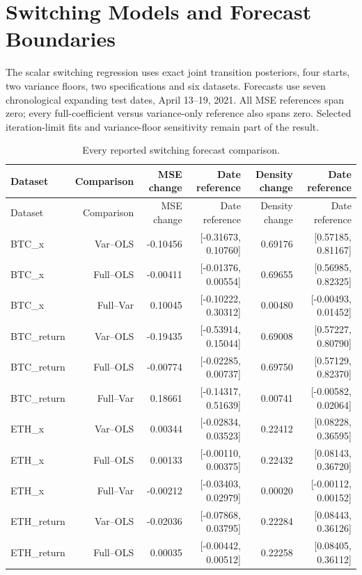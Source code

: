 \documentclass[10pt]{article}
\begin{document}
\section{Switching Models and Forecast Boundaries}
The scalar switching regression uses exact joint transition posteriors, four starts, two variance floors, two specifications and six datasets. Forecasts use seven chronological expanding test dates, April 13--19, 2021. All MSE references span zero; every full-coefficient versus variance-only reference also spans zero. Selected iteration-limit fits and variance-floor sensitivity remain part of the result.


\small\setlength{\tabcolsep}{3pt}
\begin{longtable}{lrrrrr}
\caption{Every reported switching forecast comparison.}\label{tab:all_switching_forecasts}\\
\toprule
Dataset & Comparison & MSE change & Date reference & Density change & Date reference \\\midrule\endfirsthead
\toprule
Dataset & Comparison & MSE change & Date reference & Density change & Date reference \\\midrule\endhead
BTC\_x & Var--OLS & -0.10456 & [-0.31673, 0.10760] & 0.69176 & [0.57185, 0.81167] \\
BTC\_x & Full--OLS & -0.00411 & [-0.01376, 0.00554] & 0.69655 & [0.56985, 0.82325] \\
BTC\_x & Full--Var & 0.10045 & [-0.10222, 0.30312] & 0.00480 & [-0.00493, 0.01452] \\
BTC\_return & Var--OLS & -0.19435 & [-0.53914, 0.15044] & 0.69008 & [0.57227, 0.80790] \\
BTC\_return & Full--OLS & -0.00774 & [-0.02285, 0.00737] & 0.69750 & [0.57129, 0.82370] \\
BTC\_return & Full--Var & 0.18661 & [-0.14317, 0.51639] & 0.00741 & [-0.00582, 0.02064] \\
ETH\_x & Var--OLS & 0.00344 & [-0.02834, 0.03523] & 0.22412 & [0.08228, 0.36595] \\
ETH\_x & Full--OLS & 0.00133 & [-0.00110, 0.00375] & 0.22432 & [0.08143, 0.36720] \\
ETH\_x & Full--Var & -0.00212 & [-0.03403, 0.02979] & 0.00020 & [-0.00112, 0.00152] \\
ETH\_return & Var--OLS & -0.02036 & [-0.07868, 0.03795] & 0.22284 & [0.08443, 0.36126] \\
ETH\_return & Full--OLS & 0.00035 & [-0.00442, 0.00512] & 0.22258 & [0.08405, 0.36112] \\

\end{longtable}
\end{document}
